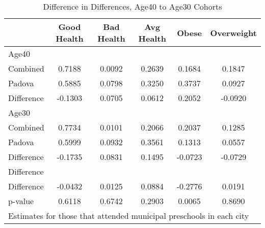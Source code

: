 \begin{table}[htbp]\centering
\caption{Difference in Differences, Age40 to Age30 Cohorts}
\begin{tabular}{l*{5}{c}}
\hline\hline
            & Good Health&  Bad Health&  Avg Health&       Obese&  Overweight\\
\hline
Age40       &            &            &            &            &            \\
Combined    &      0.7188&      0.0092&      0.2639&      0.1684&      0.1847\\
Padova      &      0.5885&      0.0798&      0.3250&      0.3737&      0.0927\\
Difference  &     -0.1303&      0.0705&      0.0612&      0.2052&     -0.0920\\
\hline
Age30       &            &            &            &            &            \\
Combined    &      0.7734&      0.0101&      0.2066&      0.2037&      0.1285\\
Padova      &      0.5999&      0.0932&      0.3561&      0.1313&      0.0557\\
Difference  &     -0.1735&      0.0831&      0.1495&     -0.0723&     -0.0729\\
\hline
Difference  &            &            &            &            &            \\
Difference  &     -0.0432&      0.0125&      0.0884&     -0.2776&      0.0191\\
p-value     &      0.6118&      0.6742&      0.2903&      0.0065&      0.8690\\
\hline\hline
\multicolumn{6}{l}{\footnotesize Estimates for those that attended municipal preschools in each city}\\
\end{tabular}
\end{table}
